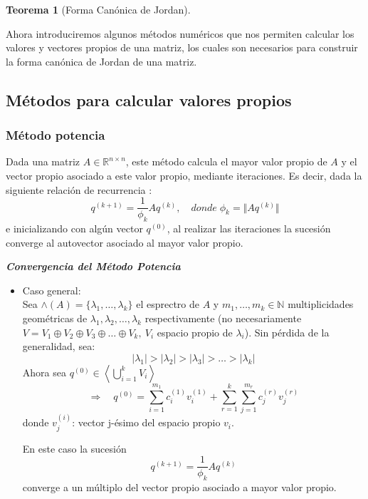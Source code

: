 \documentclass[12pt,a4paper]{article}
\newtheorem{mytheo}{Teorema}[section]
\begin{document}
\begin{multicols}{2}
\begin{mytheo}[Forma Canónica de Jordan]
\begin{enumerate}
	
\end{enumerate}
\end{mytheo}
\noindent Ahora introduciremos algunos métodos numéricos que nos permiten calcular los valores y vectores  propios de una matriz, los cuales son necesarios para construir la forma canónica de Jordan de una matriz.
\subsection{Métodos para calcular valores propios}
\subsubsection{Método potencia}
\noindent Dada una matriz $A\in \mathbb{R}^{n\times n}$, este método calcula el mayor valor propio de $A$ y el vector propio asociado a este valor propio, mediante iteraciones.
Es decir, dada la siguiente relación de recurrencia :\begin{equation*}
    q^{(k+1)} = \frac{1}{\phi_{k}}Aq^{(k)},\quad donde\;\phi_{k} = \Vert Aq^{(k)}\Vert    
\end{equation*} e inicializando con algún vector $q^{(0)}$, al realizar las iteraciones la sucesión converge al autovector asociado al mayor valor propio.

\noindent\textit{\textbf{Convergencia del Método Potencia}}
\begin{itemize}
\item Caso general:\\
Sea $\wedge(A)=\{\lambda_{1},\ldots,\lambda_{k}\}$ el esprectro de $A$ y $m_{1}, \ldots , m_{k}\in\mathbb{N}$ multiplicidades geométricas de $\lambda_{1},\lambda_{2},\ldots ,\lambda_{k}$ respectivamente (no necesariamente\\ $V=V_{1}\oplus V_{2}\oplus V_{3}\oplus\ldots\oplus V_{k},\ V_{i}$ espacio propio de $\lambda_{i}$).
Sin pérdida de la generalidad, sea:
$$\vert\lambda_{1}\vert > \vert\lambda_{2}\vert > \vert\lambda_{3}\vert > \ldots>\vert\lambda_{k}\vert$$
Ahora sea $q^{(0)}\in\left<\bigcup_{i=1}^{k}V_{i}\right>$
$$\Rightarrow\quad q^{(0)} = \sum_{i=1}^{m_{1}}c_{i}^{(1)}v_{i}^{(1)} + \sum_{r=1}^{k}\sum_{j=1}^{m_{r}}c_{j}^{(r)}v_{j}^{(r)}$$
donde $v_{j}^{(i)}$: vector j-ésimo del espacio propio $v_{i}$.



En este caso la sucesión $$q^{(k+1)}=\frac{1}{\phi_{k}}Aq^{(k)}$$ converge a un múltiplo del vector propio asociado a mayor valor propio.\\
\end{itemize}


\end{multicols}
\end{document}
